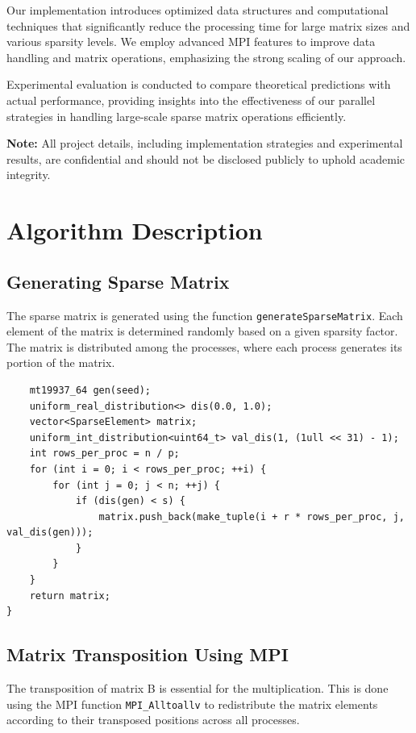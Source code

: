 \documentclass{article}
\begin{document}
Our implementation introduces optimized data structures and computational techniques that significantly reduce the processing time for large matrix sizes and various sparsity levels. We employ advanced MPI features to improve data handling and matrix operations, emphasizing the strong scaling of our approach.

Experimental evaluation is conducted to compare theoretical predictions with actual performance, providing insights into the effectiveness of our parallel strategies in handling large-scale sparse matrix operations efficiently.

\textbf{Note:} All project details, including implementation strategies and experimental results, are confidential and should not be disclosed publicly to uphold academic integrity.


\section{Algorithm Description}
\subsection{Generating Sparse Matrix}
The sparse matrix is generated using the function \texttt{generateSparseMatrix}. Each element of the matrix is determined randomly based on a given sparsity factor. The matrix is distributed among the processes, where each process generates its portion of the matrix.

\begin{verbatim}
    mt19937_64 gen(seed);
    uniform_real_distribution<> dis(0.0, 1.0);
    vector<SparseElement> matrix;
    uniform_int_distribution<uint64_t> val_dis(1, (1ull << 31) - 1);
    int rows_per_proc = n / p;
    for (int i = 0; i < rows_per_proc; ++i) {
        for (int j = 0; j < n; ++j) {
            if (dis(gen) < s) {
                matrix.push_back(make_tuple(i + r * rows_per_proc, j, val_dis(gen)));
            }
        }
    }
    return matrix;
}
\end{verbatim}

\subsection{Matrix Transposition Using MPI}
The transposition of matrix B is essential for the multiplication. This is done using the MPI function \texttt{MPI\_Alltoallv} to redistribute the matrix elements according to their transposed positions across all processes.
\end{document}
